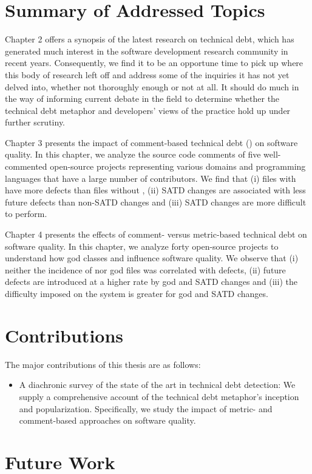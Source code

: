 
\section{Summary of Addressed Topics}


Chapter 2 offers a synopsis of the latest research on technical debt, which has generated much interest in the software development research community in recent years. Consequently, we find it to be an opportune time to pick up where this body of research left off and address some of the inquiries it has not yet delved into, whether not thoroughly enough or not at all. It should do much in the way of informing current debate in the field to determine whether the technical debt metaphor and developers' views of the practice hold up under further scrutiny.

Chapter 3 presents the impact of comment-based technical debt (\SATD) on software quality. In this chapter, we analyze the source code comments of five well-commented open-source projects representing various domains and programming languages that have a large number of contributors. We find that (i) files with \SATD have more defects than files without \SATD, (ii) SATD changes are associated with less future defects than non-SATD changes and (iii) SATD changes are more difficult to perform.

Chapter 4 presents the effects of comment- versus metric-based technical debt on software quality. In this chapter, we analyze forty open-source projects to understand how god classes and \SATD influence software quality. We observe that (i) neither the incidence of \SATD nor god files was correlated with defects, (ii) future defects are introduced at a higher rate by god and SATD changes and (iii) the difficulty imposed on the system is greater for god and SATD changes.

\section{Contributions}
The major contributions of this thesis are as follows:

\begin{itemize}
	\item A diachronic survey of the state of the art in technical debt detection: We supply a comprehensive account of the technical debt metaphor's inception and popularization. Specifically, we study the impact of metric- and comment-based approaches on software quality.
\end{itemize}
\section{Future Work}

